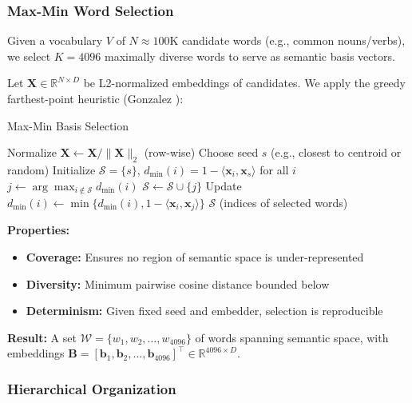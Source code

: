 \documentclass[11pt]{article}
\begin{document}
\subsubsection{Max-Min Word Selection}

Given a vocabulary $V$ of $N \approx 100\text{K}$ candidate words (e.g., common nouns/verbs), we select $K = 4096$ maximally diverse words to serve as semantic basis vectors.

Let $\mathbf{X} \in \mathbb{R}^{N \times D}$ be L2-normalized embeddings of candidates. We apply the greedy farthest-point heuristic (Gonzalez \cite{gonzalez}):

\begin{algorithm}[H]
\caption{Max-Min Basis Selection}
\begin{algorithmic}[1]
\State Normalize $\mathbf{X} \gets \mathbf{X} / \|\mathbf{X}\|_2$ (row-wise)
\State Choose seed $s$ (e.g., closest to centroid or random)
\State Initialize $\mathcal{S} = \{s\}$, $d_{\min}(i) = 1 - \langle \mathbf{x}_i, \mathbf{x}_s \rangle$ for all $i$
  \State $j \gets \arg\max_{i \notin \mathcal{S}} d_{\min}(i)$ 
  \State $\mathcal{S} \gets \mathcal{S} \cup \{j\}$
  \State Update $d_{\min}(i) \gets \min\{d_{\min}(i), 1 - \langle \mathbf{x}_i, \mathbf{x}_j \rangle\}$
\EndFor
\State \Return $\mathcal{S}$ (indices of selected words)
\end{algorithmic}
\end{algorithm}

\textbf{Properties:}
\begin{itemize}
  \item \textbf{Coverage:} Ensures no region of semantic space is under-represented
  \item \textbf{Diversity:} Minimum pairwise cosine distance bounded below
  \item \textbf{Determinism:} Given fixed seed and embedder, selection is reproducible
\end{itemize}

\textbf{Result:} A set $\mathcal{W} = \{w_1, w_2, \ldots, w_{4096}\}$ of words spanning semantic space, with embeddings $\mathbf{B} = [\mathbf{b}_1, \mathbf{b}_2, \ldots, \mathbf{b}_{4096}]^\top \in \mathbb{R}^{4096 \times D}$.

\subsubsection{Hierarchical Organization}
\end{document}
